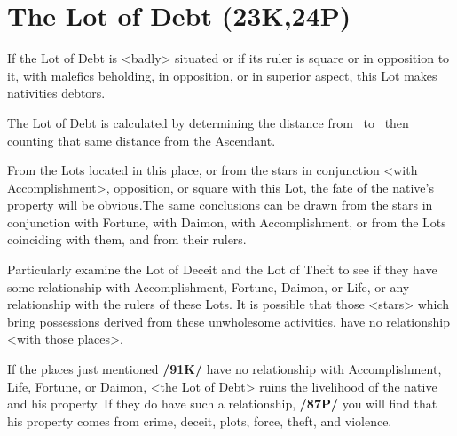 \section{The Lot of Debt (23K,24P)}


If the Lot of Debt is <badly> situated or if its ruler is square or in opposition to it, with malefics beholding, in opposition, or in superior aspect, this Lot makes nativities debtors. 

The Lot of Debt is calculated  by determining the distance from \Mercury\, to \Saturn\, then counting that same distance from the Ascendant. 

From the Lots located in this place, or from the stars in conjunction <with Accomplishment>, opposition, or square with this Lot, the fate of the native’s property will be obvious.\mndl The same conclusions can be drawn from the stars in conjunction with Fortune, with Daimon, with Accomplishment,
or from the Lots coinciding with them, and from their rulers.

Particularly examine the Lot of Deceit and the Lot of Theft to see if they have some relationship with Accomplishment, Fortune, Daimon, or Life, or any relationship with the rulers of these Lots. It is possible that those <stars> which bring possessions derived from these unwholesome activities, have no relationship <with those places>. 

If the places just mentioned \textbf{/91K/} have no relationship with Accomplishment, Life, Fortune, or Daimon, <the Lot of Debt> ruins the livelihood of the native and his property. If they do have such a relationship, \textbf{/87P/} you will find that his property comes from crime, deceit, plots, force, theft, and violence.

\newpage